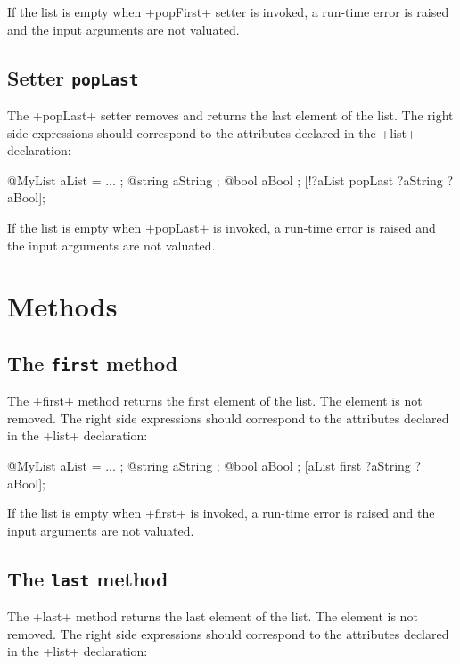 If the list is empty when \ggs+popFirst+ setter is invoked, a run-time error is raised and the input arguments are not valuated.

\subsection{Setter \texttt{popLast}}


The \ggs+popLast+ setter removes and returns the last element of the list. The right side expressions should correspond to the attributes declared in the \ggs+list+ declaration:

\begin{galgas}
@MyList aList = ... ;
@string aString ;
@bool aBool ;
[!?aList popLast ?aString ?aBool];
\end{galgas}

If the list is empty when \ggs+popLast+ is invoked, a run-time error is raised and the input arguments are not valuated.

\section{Methods}

\subsection{The \texttt{first} method}

The \ggs+first+ method returns the first element of the list. The element is not removed. The right side expressions should correspond to the attributes declared in the \ggs+list+ declaration:

\begin{galgas}
@MyList aList = ... ;
@string aString ;
@bool aBool ;
[aList first ?aString ?aBool];
\end{galgas}

If the list is empty when \ggs+first+ is invoked, a run-time error is raised and the input arguments are not valuated.

\subsection{The \texttt{last} method}

The \ggs+last+ method returns the last element of the list. The element is not removed. The right side expressions should correspond to the attributes declared in the \ggs+list+ declaration:\\

